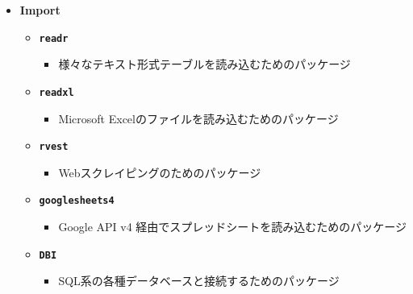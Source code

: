 \documentclass[
  12pt,
]{book}
\providecommand{\tightlist}{%
  \setlength{\itemsep}{0pt}\setlength{\parskip}{0pt}}
\begin{document}
\begin{itemize}
\tightlist
\item
  \textbf{Import}

  \begin{itemize}
  \tightlist
  \item
    \textbf{\texttt{readr}} \citep{R-readr} 

    \begin{itemize}
    \tightlist
    \item
      様々なテキスト形式テーブルを読み込むためのパッケージ
    \end{itemize}
  \item
    \textbf{\texttt{readxl}} \citep{R-readxl} 

    \begin{itemize}
    \tightlist
    \item
      Microsoft Excelのファイルを読み込むためのパッケージ
    \end{itemize}
  \item
    \textbf{\texttt{rvest}} \citep{R-rvest} 

    \begin{itemize}
    \tightlist
    \item
      Webスクレイピングのためのパッケージ
    \end{itemize}
  \item
    \textbf{\texttt{googlesheets4}} \citep{R-googlesheets4} 

    \begin{itemize}
    \tightlist
    \item
      Google API v4 経由でスプレッドシートを読み込むためのパッケージ
    \end{itemize}
  \item
    \textbf{\texttt{DBI}} \citep{R-DBI} 

    \begin{itemize}
    \tightlist
    \item
      SQL系の各種データベースと接続するためのパッケージ
    \end{itemize}
  \end{itemize}
\end{itemize}

\newpage
\end{document}
